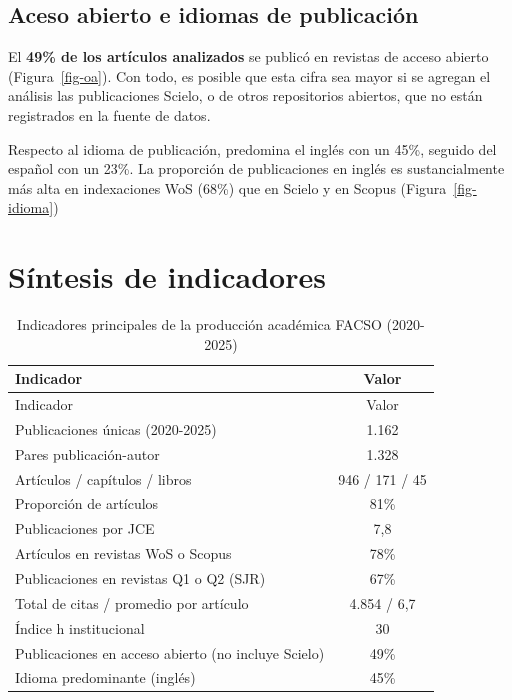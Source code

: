 \documentclass[
  a4paper,
  oneside]{scrbook}
\begin{document}
\subsection*{Aceso abierto e idiomas de
publicación}\label{aceso-abierto-e-idiomas-de-publicaciuxf3n}

El \textbf{49\% de los artículos analizados} se publicó en revistas de
acceso abierto (Figura~\ref{fig-oa}). Con todo, es posible que esta
cifra sea mayor si se agregan el análisis las publicaciones Scielo, o de
otros repositorios abiertos, que no están registrados en la fuente de
datos.

Respecto al idioma de publicación, predomina el inglés con un 45\%,
seguido del español con un 23\%. La proporción de publicaciones en
inglés es sustancialmente más alta en indexaciones WoS (68\%) que en
Scielo y en Scopus (Figura~\ref{fig-idioma})

\section*{Síntesis de indicadores}\label{suxedntesis-de-indicadores}


\begin{longtable}[]{@{}lc@{}}
\caption{Indicadores principales de la producción académica FACSO
(2020-2025)}\label{tbl-sintesis}\tabularnewline
\toprule\noalign{}
Indicador & Valor \\
\midrule\noalign{}
\endfirsthead
\toprule\noalign{}
Indicador & Valor \\
\midrule\noalign{}
\endhead
\bottomrule\noalign{}
\endlastfoot
Publicaciones únicas (2020-2025) & 1.162 \\
Pares publicación-autor & 1.328 \\
Artículos / capítulos / libros & 946 / 171 / 45 \\
Proporción de artículos & 81\% \\
Publicaciones por JCE & 7,8 \\
Artículos en revistas WoS o Scopus & 78\% \\
Publicaciones en revistas Q1 o Q2 (SJR) & 67\% \\
Total de citas / promedio por artículo & 4.854 / 6,7 \\
Índice h institucional & 30 \\
Publicaciones en acceso abierto (no incluye Scielo) & 49\% \\
Idioma predominante (inglés) & 45\% \\
\end{longtable}
\end{document}
